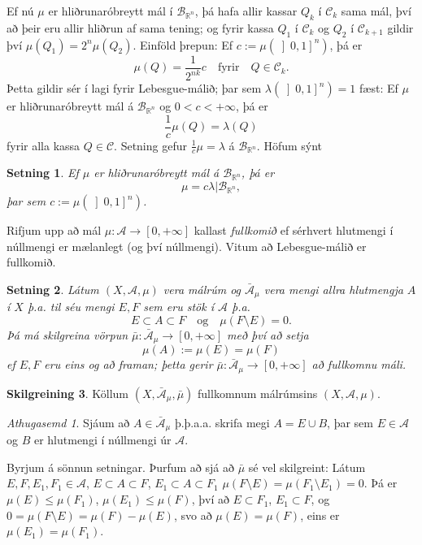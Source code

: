 \documentclass[a4paper,icelandic,11pt]{book}
\theoremstyle{plain}      \newtheorem{setn}{Setning}[chapter]
\theoremstyle{definition} \newtheorem{skilgr}[setn]{Skilgreining}
\theoremstyle{remark}     \newtheorem*{ath}{Athugasemd}
\newcommand{\R}{\mathbb R}
\begin{document}
Ef nú $\mu$ er hliðrunaróbreytt mál í $\mathcal B_{\R^{n}}$, þá hafa
allir kassar $Q_{k}$ í $\mathcal C_{k}$ sama mál, því að þeir eru
allir hliðrun af sama tening; og fyrir kassa $Q_{1}$ í
$\mathcal{C}_{k}$ og $Q_{2}$ í $\mathcal{C}_{k+1}$ gildir því
$\mu(Q_{1})=2^{n}\mu(Q_{2})$. Einföld þrepun: Ef
$c:=\mu(\left]0,1\right]^{n})$, þá er
\[
\mu(Q)=\frac{1}{2^{nk}}c \quad\text{fyrir}\quad Q\in\mathcal C_{k}.
\]
Þetta gildir sér í lagi fyrir Lebesgue-málið; þar sem
$\lambda(\left]0,1\right]^{n})=1$ fæst: Ef $\mu$ er hliðrunaróbreytt
mál á $\mathcal B_{\R^{n}}$ og $0<c<+\infty$, þá er
\[
\frac{1}{c}\mu(Q)=\lambda(Q)
\]
fyrir alla kassa $Q\in\mathcal C$. Setning gefur $\frac 1c\mu=\lambda$
á $\mathcal B_{\R^{n}}$. Höfum sýnt
\begin{setn}
  Ef $\mu$ er hliðrunaróbreytt mál á $\mathcal B_{\R^{n}}$, þá er
  \[
  \mu = c\lambda|\mathcal B_{\R^{n}},
  \]
  þar sem $c := \mu(\left]0,1\right]^{n})$.
\end{setn}
Rifjum upp að mál $\mu:\mathcal A\to\left[0,+\infty\right]$ kallast
\emph{fullkomið}
ef sérhvert hlutmengi í núllmengi er mælanlegt (og því
núllmengi). Vitum að Lebesgue-málið er fullkomið.
\begin{setn}
  Látum $(X,\mathcal A,\mu)$ vera málrúm og $\bar{\mathcal A}_{\mu}$
  vera mengi allra hlutmengja $A$ í $X$ þ.a. til séu mengi $E,F$ sem
  eru stök í $\mathcal A$ þ.a.
  \[
  E\subset A \subset F
  \quad\text{og}\quad
  \mu(F\setminus E) = 0.
  \]
  Þá má skilgreina vörpun
  $\bar\mu:\bar{\mathcal A}_{\mu}\to\left[0,+\infty\right]$ með því að
  setja
  \[
  \mu(A) := \mu(E) = \mu(F)
  \]
  ef $E,F$ eru eins og að framan; þetta gerir
  $\bar\mu:\bar{\mathcal A}_{\mu}\to\left[0,+\infty\right]$ að
  fullkomnu máli.
\end{setn}
\begin{skilgr}
  Köllum $(X,\bar{\mathcal A}_{\mu},\bar\mu)$ fullkomnum málrúmsins
  $(X,\mathcal A,\mu)$.
\end{skilgr}
\begin{ath}
  Sjáum að $A\in\bar{\mathcal A}_{\mu}$ þ.þ.a.a. skrifa megi
  $A=E\cup{B}$, þar sem $E\in\mathcal{A}$ og $B$ er hlutmengi í
  núllmengi úr $\mathcal A$.
\end{ath}
Byrjum á sönnun setningar. Þurfum að sjá að $\bar\mu$ sé vel
skilgreint: Látum $E,F,E_{1},F_{1}\in\mathcal{A}$,
$E\subset{A}\subset{F}$, $E_{1}\subset A\subset F_{1}$
$\mu(F\setminus E)=\mu(F_{1}\setminus E_{1})=0$. Þá er
$\mu(E)\le\mu(F_{1})$, $\mu(E_{1})\le\mu(F)$, því að
$E\subset{F_{1}}$, $E_{1}\subset F$, og
$0=\mu(F\setminus{E})=\mu(F)-\mu(E)$, svo að $\mu(E)=\mu(F)$, eins
er $\mu(E_{1})=\mu(F_{1})$.
\end{document}
